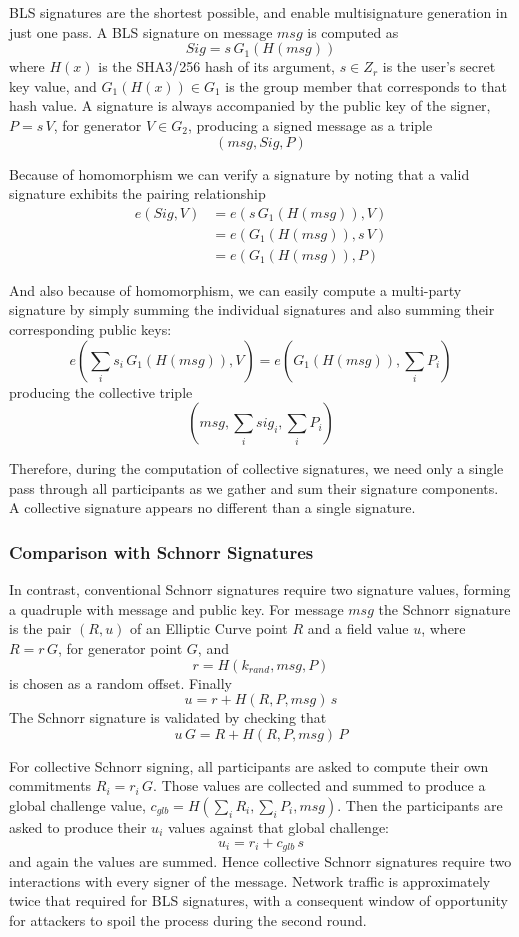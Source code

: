 \documentclass{yellowpaper}
\begin{document}
BLS signatures are the shortest possible, and enable multisignature generation in just one pass. A BLS signature on message $msg$ is computed as $$Sig = s \, G_1(H(msg))$$ where $H(x)$ is the SHA3/256 hash of its argument, $s \in Z_r$ is the user's secret key value, and $G_1(H(x)) \in G_1$ is the group member that corresponds to that hash value. A signature is always accompanied by the public key of the signer, $P = s \, V$, for generator $V \in G_2$,  producing a signed message as a triple $$(msg, Sig, P)$$

Because of homomorphism we can verify a signature by noting that a valid signature exhibits the pairing relationship 
$$
\begin{align}
    e(Sig,V) &= e(s \, G_1(H(msg)),V)\\
             &= e(G_1(H(msg)), s \, V) \\
             &= e(G_1(H(msg)), P)
\end{align}
$$

And also because of homomorphism, we can easily compute a multi-party signature by simply summing the individual signatures and also summing their corresponding public keys: 
$$e({\sum_i s_i} \, G_1(H(msg)),V) = e(G_1(H(msg)), {\sum_i P_i})$$
producing the collective triple 
$$(msg, {\sum_i sig_i}, {\sum_i P_i})$$

Therefore, during the computation of collective signatures, we need only a single pass through all participants as we gather and sum their signature components. A collective signature appears no different than a single signature.\\

\subsubsection{Comparison with Schnorr Signatures}
In contrast, conventional Schnorr signatures require two signature values, forming a quadruple with message and public key. For message $msg$ the Schnorr signature is the pair $(R,u)$ of an Elliptic Curve point $R$ and a field value $u$, where $R = r \, G$, for generator point $G$, and 
$$r = H(k_{rand}, msg, P)$$ 
is chosen as a random offset. Finally 
$$u = r + H(R,P,msg)\, s$$ 
The Schnorr signature is validated by checking that 
$$u\, G = R + H(R, P, msg)\, P$$

For collective Schnorr signing, all participants are asked to compute their own commitments $R_i = r_i\, G$. Those values are collected and summed to produce a global challenge value, $c_{glb} = H(\sum_i R_i, \sum_i P_i, msg)$.  Then the participants are asked to produce their $u_i$ values against that global challenge:
$$u_i = r_i + c_{glb} \, s$$
and again the values are summed. Hence collective Schnorr signatures require two interactions with every signer of the message. Network traffic is approximately twice that required for BLS signatures, with a consequent window of opportunity for attackers to spoil the process during the second round.
\end{document}
